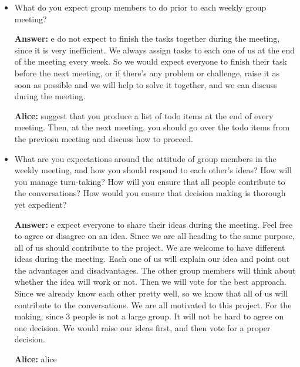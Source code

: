 \documentclass[12pt]{article}
\newenvironment{answer}[1]{
\color{blue}
	{\bf Answer:}
}{
}
\newenvironment{alice}[1]{
\color{magenta}
	{\bf Alice:}
}{
}
\begin{document}
\begin{itemize}
\item What do you expect group members to do prior to each weekly group meeting? 

\begin{answer}

We do not expect to finish the tasks together during the meeting, since it is very inefficient. We always assign tasks to each one of us at the end of the meeting every week. So we would expect everyone 
to finish their task before the next meeting, or if there's any problem or challenge, raise it as soon as possible and we will help to solve it together, and we can discuss during the meeting.
\end{answer}

\begin{alice}

I suggest that you produce a list of todo items at the end of every meeting.  Then, at the next meeting, you should go over the todo items from the previosu meeting and discuss how to proceed. 

\end{alice}


\item What are you expectations around the attitude of group members in the weekly meeting, and how you should respond to each other's ideas?  How will you manage turn-taking? How will you ensure that all people contribute to the conversations? How would you ensure that decision making is thorough yet expedient?

\begin{answer}

We expect everyone to share their ideas during the meeting. Feel free to agree or disagree on an idea. Since we are all heading to the same purpose, all of us should contribute to the project. 
We are welcome to have different ideas during the meeting. Each one of us will explain our idea and point out the advantages and disadvantages. The other group members will think about whether the idea will work or not.
Then we will vote for the best approach. Since we already know each other pretty well, so we know that all of us will contribute to the conversations. We are all motivated to this project.
For the  making, since 3 people is not a large group. It will not be hard to agree on one decision. We would raise our ideas first, and then vote for a proper decision.
\end{answer}

\begin{alice}


\end{alice}
\end{itemize}
\end{document}
